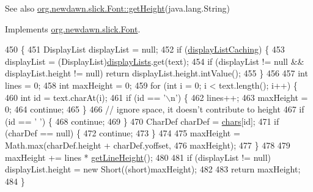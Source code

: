 \begin{DoxySeeAlso}{See also}
\mbox{\hyperlink{interfaceorg_1_1newdawn_1_1slick_1_1_font_ac6a8b604bee484ad3ac2dd57a3eb65c9}{org.\+newdawn.\+slick.\+Font\+::get\+Height}}(java.\+lang.\+String) 
\end{DoxySeeAlso}


Implements \mbox{\hyperlink{interfaceorg_1_1newdawn_1_1slick_1_1_font_ac6a8b604bee484ad3ac2dd57a3eb65c9}{org.\+newdawn.\+slick.\+Font}}.


\begin{DoxyCode}
450                                       \{
451         DisplayList displayList = null;
452         \textcolor{keywordflow}{if} (\mbox{\hyperlink{classorg_1_1newdawn_1_1slick_1_1_angel_code_font_a1b429bd8175e017d9df97818af84cb06}{displayListCaching}}) \{
453             displayList = (DisplayList)\mbox{\hyperlink{classorg_1_1newdawn_1_1slick_1_1_angel_code_font_ad2583887204ad560daf5546b8eb6ee7d}{displayLists}}.get(text);
454             \textcolor{keywordflow}{if} (displayList != null && displayList.height != null) \textcolor{keywordflow}{return} displayList.height.intValue();
455         \}
456 
457         \textcolor{keywordtype}{int} lines = 0;
458         \textcolor{keywordtype}{int} maxHeight = 0;
459         \textcolor{keywordflow}{for} (\textcolor{keywordtype}{int} i = 0; i < text.length(); i++) \{
460             \textcolor{keywordtype}{int} \textcolor{keywordtype}{id} = text.charAt(i);
461             \textcolor{keywordflow}{if} (\textcolor{keywordtype}{id} == \textcolor{charliteral}{'\(\backslash\)n'}) \{
462                 lines++;
463                 maxHeight = 0;
464                 \textcolor{keywordflow}{continue};
465             \}
466             \textcolor{comment}{// ignore space, it doesn't contribute to height}
467             \textcolor{keywordflow}{if} (\textcolor{keywordtype}{id} == \textcolor{charliteral}{' '}) \{
468                 \textcolor{keywordflow}{continue};
469             \}
470             CharDef charDef = \mbox{\hyperlink{classorg_1_1newdawn_1_1slick_1_1_angel_code_font_acdb3d26438f0f30d33db0a543715a3b1}{chars}}[id];
471             \textcolor{keywordflow}{if} (charDef == null) \{
472                 \textcolor{keywordflow}{continue};
473             \}
474 
475             maxHeight = Math.max(charDef.height + charDef.yoffset,
476                     maxHeight);
477         \}
478 
479         maxHeight += lines * \mbox{\hyperlink{classorg_1_1newdawn_1_1slick_1_1_angel_code_font_aa462c138af142eb6086c66205b0456af}{getLineHeight}}();
480         
481         \textcolor{keywordflow}{if} (displayList != null) displayList.height = \textcolor{keyword}{new} Short((\textcolor{keywordtype}{short})maxHeight);
482         
483         \textcolor{keywordflow}{return} maxHeight;
484     \}
\end{DoxyCode}
\mbox{\label{classorg_1_1newdawn_1_1slick_1_1_angel_code_font_aa462c138af142eb6086c66205b0456af}} 
